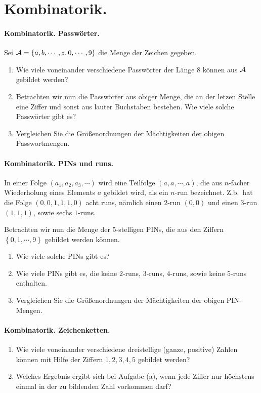 \section{Kombinatorik.}


\paragraph{Kombinatorik. Passwörter.} Sei 
$\mathcal A = \left\{ a, b, \cdots, z, 0, \cdots, 9 \right\}$ die Menge der Zeichen
gegeben. 
\begin{enumerate}
    \item Wie viele voneinander verschiedene Passwörter der Länge 8 können
        aus $\mathcal A$ gebildet werden?
    \item Betrachten wir nun die Passwörter aus obiger Menge, die an der
        letzen Stelle eine Ziffer und sonst aus lauter Buchstaben bestehen. 
        Wie viele solche Passwörter gibt es?
    \item Vergleichen Sie die Größenordnungen der Mächtigkeiten der obigen
        Passwortmengen. 
\end{enumerate}


\paragraph{Kombinatorik. PINs und runs.} In einer Folge $\left( a_1, a_2, a_3,
\cdots \right)$ wird eine Teilfolge $(a, a, \cdots, a)$, die aus $n$-facher
Wiederholung eines Elements $a$ gebildet wird, als ein $n$-run bezeichnet.
Z.b.\ hat die Folge $(0, 0, 1, 1, 1, 0)$ acht runs, nämlich einen $2$-run
$(0,0)$ und einen $3$-run $(1,1,1)$, sowie sechs $1$-runs.

Betrachten wir nun die Menge der 5-stelligen PINs, die aus den Ziffern $\left\{
0,1, \cdots, 9 \right\}$ gebildet werden können. 
\begin{enumerate}
    \item Wie viele solche PINs gibt es?
    \item Wie viele PINs gibt es, die keine $2$-runs, $3$-runs, $4$-runs, sowie keine 
        $5$-runs enthalten.
    \item Vergleichen Sie die Größenordnungen der Mächtigkeiten der obigen
        PIN-Mengen. 
\end{enumerate}


\paragraph{Kombinatorik. Zeichenketten.}
\begin{enumerate}
\item Wie viele voneinander verschiedene dreistellige (ganze, positive)
Zahlen können mit Hilfe der Ziffern $1,2,3,4,5$ gebildet werden?
\item Welches Ergebnis ergibt sich bei Aufgabe (a), wenn jede Ziffer nur
höchstens einmal in der zu bildenden Zahl vorkommen darf?
\end{enumerate}


